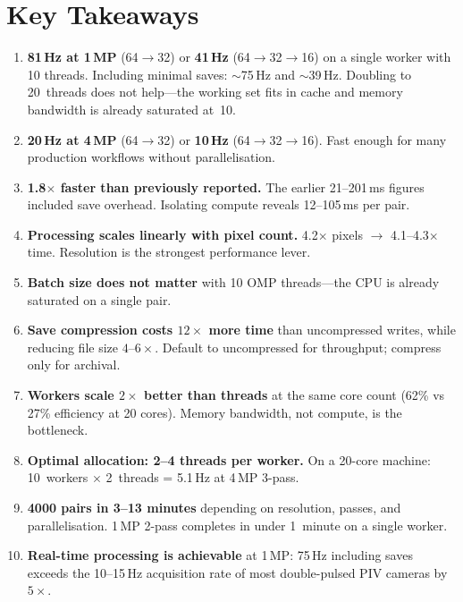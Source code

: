 \documentclass[10pt,a4paper,twocolumn]{article}
\begin{document}
\section{Key Takeaways}

\begin{enumerate}[leftmargin=1.4em]

\item \textbf{81\,Hz at 1\,MP} (64$\to$32) or \textbf{41\,Hz} (64$\to$32$\to$16) on a single worker with 10 threads. Including minimal saves: ${\sim}$75\,Hz and ${\sim}$39\,Hz. Doubling to 20~threads does not help---the working set fits in cache and memory bandwidth is already saturated at~10.

\item \textbf{20\,Hz at 4\,MP} (64$\to$32) or \textbf{10\,Hz} (64$\to$32$\to$16). Fast enough for many production workflows without parallelisation.

\item \textbf{1.8$\times$ faster than previously reported.} The earlier 21--201\,ms figures included save overhead. Isolating compute reveals 12--105\,ms per pair.

\item \textbf{Processing scales linearly with pixel count.} 4.2$\times$ pixels $\to$ 4.1--4.3$\times$ time. Resolution is the strongest performance lever.

\item \textbf{Batch size does not matter} with 10 OMP threads---the CPU is already saturated on a single pair.

\item \textbf{Save compression costs $12\times$ more time} than uncompressed writes, while reducing file size $4\text{--}6\times$. Default to uncompressed for throughput; compress only for archival.

\item \textbf{Workers scale $2\times$ better than threads} at the same core count (62\% vs 27\% efficiency at 20 cores). Memory bandwidth, not compute, is the bottleneck.

\item \textbf{Optimal allocation: 2--4 threads per worker.} On a 20-core machine: 10~workers $\times$ 2~threads = 5.1\,Hz at 4\,MP 3-pass.

\item \textbf{4000 pairs in 3--13 minutes} depending on resolution, passes, and parallelisation. 1\,MP 2-pass completes in under 1~minute on a single worker.

\item \textbf{Real-time processing is achievable} at 1\,MP: 75\,Hz including saves exceeds the 10--15\,Hz acquisition rate of most double-pulsed PIV cameras by $5\times$.
\end{enumerate}
\end{document}

